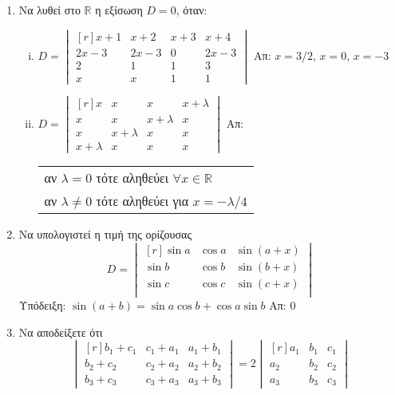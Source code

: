 \documentclass[a4paper,table]{report}
\begin{document}
\begin{center}
\minibox{\large\bfseries\textcolor{Col1}{Ορίζουσες}}
\end{center}

\vspace{\baselineskip}

\begin{enumerate}
  \item Να λυθεί στο $\mathbb{R}$ η εξίσωση $ D=0 $, όταν:
    \begin{enumerate}[i)]
      \item 
        $
        D = 
        \begin{vmatrix*}[r]
          x+1 & x+2 & x+3 & x+4 \\
          2x-3 & 2x-3 & 0 & 2x-3 \\
          2 & 1 & 1 & 3 \\
          x & x & 1 & 1
        \end{vmatrix*} 
        $
        \hfill Απ: $ x=3/2 $, $x=0$, $ x=-3 $   
      \item 
        $
        D=
        \begin{vmatrix*}[r]
          x & x & x & x + \lambda \\
          x & x & x+ \lambda & x \\
          x & x+ \lambda & x & x \\
          x+ \lambda & x & x & x 
        \end{vmatrix*}
        $
        \hfill Απ:
        \begin{tabular}{l}
          αν $\lambda =0$ τότε αληθεύει $ \forall x \in \mathbb{R} $ \\
          αν $\lambda \neq 0$ τότε αληθεύει για $ x=- \lambda /4 $ 
        \end{tabular} 
    \end{enumerate}

  \item Να υπολογιστεί η τιμή της ορίζουσας
    \[
      D = 
      \begin{vmatrix*}[r]
        \sin{a} & \cos{a} & \sin{(a+x)} \\
        \sin{b} & \cos{b} & \sin{(b+x)} \\
        \sin{c} & \cos{c} & \sin{(c+x)} \\
      \end{vmatrix*} 
    \]
    \hfill \textcolor{Col2}{Υπόδειξη:} 
    $ \sin{(a+b) = \sin{a} \cos{b} + \cos{a} \sin{b}} $ \quad Απ: $ 0 $  

  \item Να αποδείξετε ότι
    \[
      \begin{vmatrix*}[r]
        b_{1}+ c_{1} & c_{1}+ a_{1} & a_{1}+ b_{1} \\
        b_{2}+ c_{2} & c_{2}+ a_{2} & a_{2}+ b_{2} \\
        b_{3}+ c_{3} & c_{3}+ a_{3} & a_{3}+ b_{3} 
      \end{vmatrix*} = 2 
      \begin{vmatrix*}[r]
        a_{1}& b_{1}& c_{1} \\
        a_{2}& b_{2}& c_{2} \\
        a_{3}& b_{3}& c_{3} 
      \end{vmatrix*}
    \]


\end{enumerate}
\end{document}
